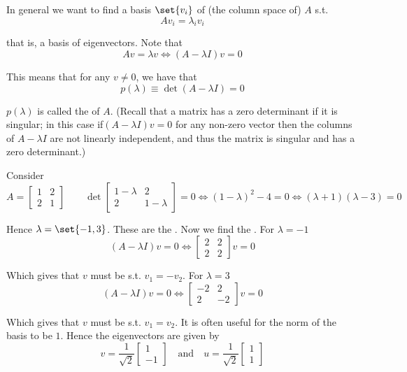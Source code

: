 \documentclass{article}
\begin{document}
In general we want to find a basis $\set{v_i}$ of (the column space of) $A$ s.t.
\[
  Av_i = \lambda_i v_i
\]

that is, a basis of eigenvectors. Note that
\[
  Av = \lambda v
  \iff
  (A - \lambda I) v = 0
\]

This means that for any $v \ne 0$, we have that
\[
  p(\lambda) \equiv \det(A - \lambda I) = 0
\]

$p(\lambda)$ is called the  of $A$. (Recall that a matrix has a zero determinant if it is singular; in this case if$(A - \lambda I)v = 0$ for any non-zero vector then the columns of $A - \lambda I$ are not linearly independent, and thus the matrix is singular and has a zero determinant.)

\begin{example}\label{example:lecture6_eigen_example}
  Consider
  \[
    A = \left[\begin{matrix}
        1 & 2 \\ 2 & 1
    \end{matrix}\right]
    \quad\quad
    \det
    \left[\begin{matrix}
        1 - \lambda & 2 \\ 2 & 1 - \lambda
    \end{matrix}\right]
    = 0
    \iff
    (1 - \lambda)^2 - 4 = 0
    \iff
    (\lambda + 1)(\lambda - 3) = 0
  \]

  Hence $\lambda = \set{-1, 3}$. These are the . Now we find the . For $\lambda = -1$
  \[
    (A - \lambda I)v = 0
    \iff
    \left[\begin{matrix}
        2 & 2 \\ 2 & 2
    \end{matrix}\right] v = 0
  \]

  Which gives that $v$ must be s.t. $v_1 = -v_2$. For $\lambda = 3$
  \[
    (A - \lambda I)v = 0
    \iff
    \left[\begin{matrix}
        -2 & 2 \\ 2 & -2
    \end{matrix}\right] v = 0
  \]

  Which gives that $v$ must be s.t. $v_1 = v_2$. It is often useful for the norm of the basis to be $1$. Hence the eigenvectors are given by
  \[
    v =
    \dfrac{1}{\sqrt{2}}
    \left[\begin{matrix}
      1 \\ -1
    \end{matrix}\right]
    \quad\text{and}\quad
    u =
    \dfrac{1}{\sqrt{2}}
    \left[\begin{matrix}
      1 \\ 1
    \end{matrix}\right]
  \]


\end{example}
\end{document}
